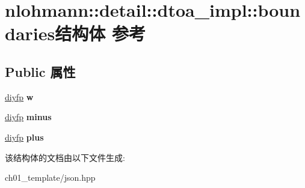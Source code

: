 \hypertarget{structnlohmann_1_1detail_1_1dtoa__impl_1_1boundaries}{}\section{nlohmann\+::detail\+::dtoa\+\_\+impl\+::boundaries结构体 参考}
\label{structnlohmann_1_1detail_1_1dtoa__impl_1_1boundaries}
\subsection*{Public 属性}
\begin{DoxyCompactItemize}
\item 
\mbox{\label{structnlohmann_1_1detail_1_1dtoa__impl_1_1boundaries_ad1668c60aeade5f2557fafed8b8aee1a}} 
\mbox{\hyperlink{structnlohmann_1_1detail_1_1dtoa__impl_1_1diyfp}{diyfp}} {\bfseries w}
\item 
\mbox{\label{structnlohmann_1_1detail_1_1dtoa__impl_1_1boundaries_aec4e5028333c01f3229062f31ce16763}} 
\mbox{\hyperlink{structnlohmann_1_1detail_1_1dtoa__impl_1_1diyfp}{diyfp}} {\bfseries minus}
\item 
\mbox{\label{structnlohmann_1_1detail_1_1dtoa__impl_1_1boundaries_a3321ae2816a6ec5250a0d8e29f798232}} 
\mbox{\hyperlink{structnlohmann_1_1detail_1_1dtoa__impl_1_1diyfp}{diyfp}} {\bfseries plus}
\end{DoxyCompactItemize}


该结构体的文档由以下文件生成\+:\begin{DoxyCompactItemize}
\item 
ch01\+\_\+template/json.\+hpp\end{DoxyCompactItemize}
